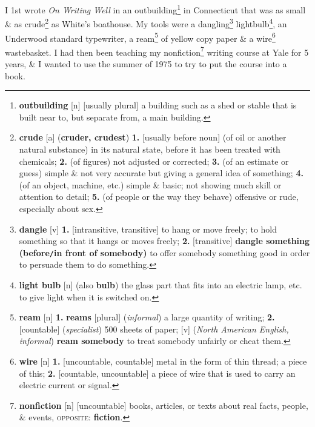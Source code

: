 \documentclass[oneside]{book}
\numberwithin{equation}{section}
\begin{document}
I 1st wrote \textit{On Writing Well} in an outbuilding\footnote{\textbf{outbuilding} [n] [usually plural] a building such as a shed or stable that is built near to, but separate from, a main building.} in Connecticut that was as small \& as crude\footnote{\textbf{crude} [a] (\textbf{cruder, crudest}) \textbf{1.} [usually before noun] (of oil or another natural substance) in its natural state, before it has been treated with chemicals; \textbf{2.} (of figures) not adjusted or corrected; \textbf{3.} (of an estimate or guess) simple \& not very accurate but giving a general idea of something; \textbf{4.} (of an object, machine, etc.) simple \& basic; not showing much skill or attention to detail; \textbf{5.} (of people or the way they behave) offensive or rude, especially about sex.} as White's boathouse. My tools were a dangling\footnote{\textbf{dangle} [v] \textbf{1.} [intransitive, transitive] to hang or move freely; to hold something so that it hangs or moves freely; \textbf{2.} [transitive] \textbf{dangle something (before\texttt{/}in front of somebody)} to offer somebody something good in order to persuade them to do something.} lightbulb\footnote{\textbf{light bulb} [n] (also \textbf{bulb}) the glass part that fits into an electric lamp, etc. to give light when it is switched on.}, an Underwood standard typewriter, a ream\footnote{\textbf{ream} [n] \textbf{1.} \textbf{reams} [plural] (\textit{informal}) a large quantity of writing; \textbf{2.} [countable] (\textit{specialist}) 500 sheets of paper; [v] (\textit{North American English, informal}) \textbf{ream somebody} to treat somebody unfairly or cheat them.} of yellow copy paper \& a wire\footnote{\textbf{wire} [n] \textbf{1.} [uncountable, countable] metal in the form of thin thread; a piece of this; \textbf{2.} [countable, uncountable] a piece of wire that is used to carry an electric current or signal.} wastebasket. I had then been teaching my nonfiction\footnote{\textbf{nonfiction} [n] [uncountable] books, articles, or texts about real facts, people, \& events, \textsc{opposite}: \textbf{fiction}.} writing course at Yale for 5 years, \& I wanted to use the summer of 1975 to try to put the course into a book.
\end{document}
